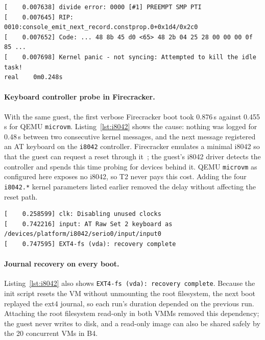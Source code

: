\documentclass[pdflatex,sn-mathphys-num]{sn-jnl}%
\begin{document}
\begin{lstlisting}[caption={Excerpt of the first T2 boot log (registers and call trace omitted)},label={lst:panic},float=ht]
[    0.007638] divide error: 0000 [#1] PREEMPT SMP PTI
[    0.007645] RIP: 0010:console_emit_next_record.constprop.0+0x1d4/0x2c0
[    0.007652] Code: ... 48 8b 45 d0 <65> 48 2b 04 25 28 00 00 00 0f 85 ...
[    0.007698] Kernel panic - not syncing: Attempted to kill the idle task!
real    0m0.248s
\end{lstlisting}

\paragraph{Keyboard controller probe in Firecracker.}\label{sec:i8042}
With the same guest, the first verbose Firecracker boot took 0.876\,s against 0.455\,s for QEMU \texttt{microvm}. Listing~\ref{lst:i8042} shows the cause: nothing was logged for 0.48\,s between two consecutive kernel messages, and the next message registered an AT keyboard on the \texttt{i8042} controller. Firecracker emulates a minimal i8042 so that the guest can request a reset through it~\cite{agache2020firecracker}; the guest's i8042 driver detects the controller and spends this time probing for devices behind it. QEMU \texttt{microvm} as configured here exposes no i8042, so T2 never pays this cost. Adding the four \texttt{i8042.*} kernel parameters listed earlier removed the delay without affecting the reset path.

\begin{lstlisting}[caption={Firecracker default boot: a 0.48\,s gap before the keyboard is registered},label={lst:i8042},float=ht]
[    0.258599] clk: Disabling unused clocks
[    0.742216] input: AT Raw Set 2 keyboard as /devices/platform/i8042/serio0/input/input0
[    0.747595] EXT4-fs (vda): recovery complete
\end{lstlisting}

\paragraph{Journal recovery on every boot.}
Listing~\ref{lst:i8042} also shows \texttt{EXT4-fs (vda): recovery complete}. Because the init script resets the VM without unmounting the root filesystem, the next boot replayed the ext4 journal, so each run's duration depended on the previous run. Attaching the root filesystem read-only in both VMMs removed this dependency; the guest never writes to disk, and a read-only image can also be shared safely by the 20 concurrent VMs in B4.
\end{document}
